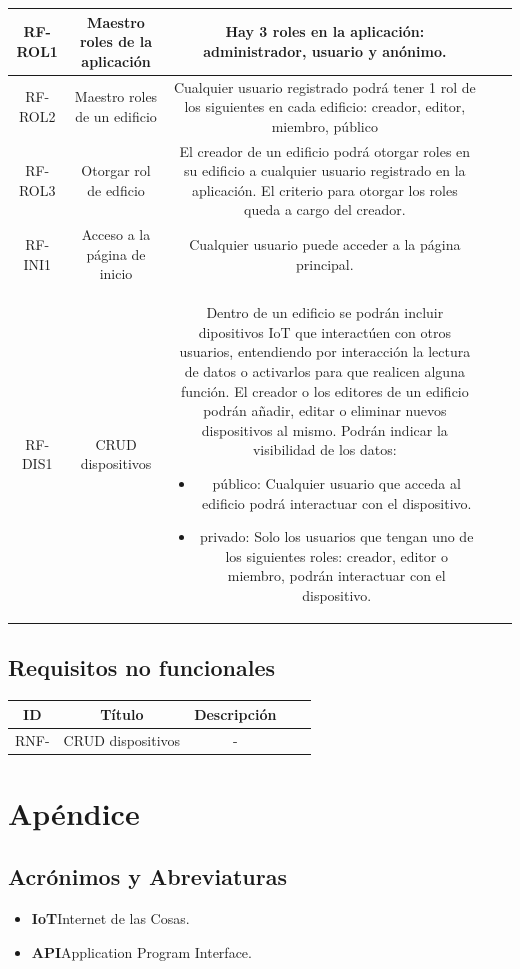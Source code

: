 \documentclass[12pt, a4paper, twoside]{article}
\newcommand\ttab{\tab \hspace{-5cm}}
\begin{document}
\begin{center}
\begin{tabular}{ |c|c|c|c|c| }
  RF-ROL1 & Maestro roles de la aplicación & Hay 3 roles en la aplicación: administrador, usuario y anónimo. \\ \hline
  RF-ROL2 & Maestro roles de un edificio & Cualquier usuario registrado podrá tener 1 rol de los siguientes en cada edificio: creador, editor, miembro, público \\ \hline
  RF-ROL3 & Otorgar rol de edficio & El creador de un edificio podrá otorgar roles en su edificio a cualquier usuario registrado en la aplicación. El criterio para otorgar los roles queda a cargo del creador. \\ \hline

  RF-INI1 & Acceso a la página de inicio & Cualquier usuario puede acceder a la página principal. \\ \hline

  RF-DIS1 & CRUD dispositivos & Dentro de un edificio se podrán incluir dipositivos IoT que interactúen con otros usuarios, entendiendo por 
  interacción la lectura de datos o activarlos para que realicen alguna función.
  El creador o los editores de un edificio podrán añadir, editar o eliminar nuevos dispositivos al mismo. Podrán indicar la visibilidad de los datos: 
  \begin{itemize}
    \item público: Cualquier usuario que acceda al edificio podrá interactuar con el dispositivo.
    \item privado: Solo los usuarios que tengan uno de los siguientes roles: creador, editor o miembro, podrán interactuar con el dispositivo.
  \end{itemize}
  \\ \hline
  \end{tabular}
\end{center}

 \subsection{Requisitos no funcionales}
 \begin{center}
  \begin{tabular}{ |c|c|c|c|c| } 
  \hline
  ID      & Título & Descripción \\ \hline
  RNF- & CRUD dispositivos & - \\ \hline

  \end{tabular}
\end{center}
\section{Apéndice}
\subsection{Acrónimos y Abreviaturas}
\begin{itemize}
    \item \textbf{IoT}\ttab Internet de las Cosas.
    \item \textbf{API}\ttab Application Program Interface.
  \end{itemize}
\end{document}

